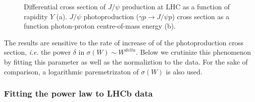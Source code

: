 \documentclass[12pt]{article}
\begin{document}
\begin{figure}[!h]
  \centering
  \caption{Differential cross section  of $J/\psi$ production  at LHC as a function of rapidity $Y$ (a). $J/\psi$ photoproduction ($\gamma p \to J/\psi p$) cross section as a function photon-proton centre-of-mass energy (b).}
\end{figure}


The results are sensitive to the rate of increase of of the photoproduction cross section, {\it i.e.} the power
$\delta$ in $\sigma(W)\sim W^{delta}$. Below we crutinize this phenomenon by fitting this parameter as well as the normaliztion to the data. For the sake of comparison, a logarithmic paremetrizaton of $\sigma(W)$ is also used.


\subsubsection{Fitting the power law to LHCb data}
\end{document}
